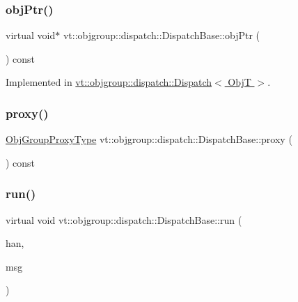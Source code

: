 \subsubsection{\texorpdfstring{obj\+Ptr()}{objPtr()}}
{\footnotesize\ttfamily virtual void$\ast$ vt\+::objgroup\+::dispatch\+::\+Dispatch\+Base\+::obj\+Ptr (\begin{DoxyParamCaption}{ }\end{DoxyParamCaption}) const\hspace{0.3cm}{\ttfamily [pure virtual]}}



Implemented in \hyperlink{structvt_1_1objgroup_1_1dispatch_1_1_dispatch_aea2f9957c5f4b07413a205d34bcfbd5c}{vt\+::objgroup\+::dispatch\+::\+Dispatch$<$ Obj\+T $>$}.

\mbox{\label{structvt_1_1objgroup_1_1dispatch_1_1_dispatch_base_a2ab9479966f207847a271999a510f53d}} 
\subsubsection{\texorpdfstring{proxy()}{proxy()}}
{\footnotesize\ttfamily \hyperlink{namespacevt_ad7cae989df485fccca57f0792a880a8e}{Obj\+Group\+Proxy\+Type} vt\+::objgroup\+::dispatch\+::\+Dispatch\+Base\+::proxy (\begin{DoxyParamCaption}{ }\end{DoxyParamCaption}) const\hspace{0.3cm}{\ttfamily [inline]}}

\mbox{\label{structvt_1_1objgroup_1_1dispatch_1_1_dispatch_base_a539a57642138f35e38419e57e9138a2f}} 
\subsubsection{\texorpdfstring{run()}{run()}}
{\footnotesize\ttfamily virtual void vt\+::objgroup\+::dispatch\+::\+Dispatch\+Base\+::run (\begin{DoxyParamCaption}\item[{\hyperlink{namespacevt_af64846b57dfcaf104da3ef6967917573}{Handler\+Type}}]{han,  }\item[{\hyperlink{namespacevt_ac34f95a5e2b8109b55bfba52b074443d}{Base\+Message} $\ast$}]{msg }\end{DoxyParamCaption})\hspace{0.3cm}{\ttfamily [pure virtual]}}



